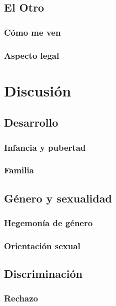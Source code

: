 \subsection{El Otro}

\subsubsection{Cómo me ven}

\subsubsection{Aspecto legal}

\section{Discusión}\label{sec:discusion}

\subsection{Desarrollo}

\subsubsection{Infancia y pubertad}

\subsubsection{Familia}

\subsection{Género y sexualidad}

\subsubsection{Hegemonía de género}

\subsubsection{Orientación sexual}

\subsection{Discriminación}

\subsubsection{Rechazo}

